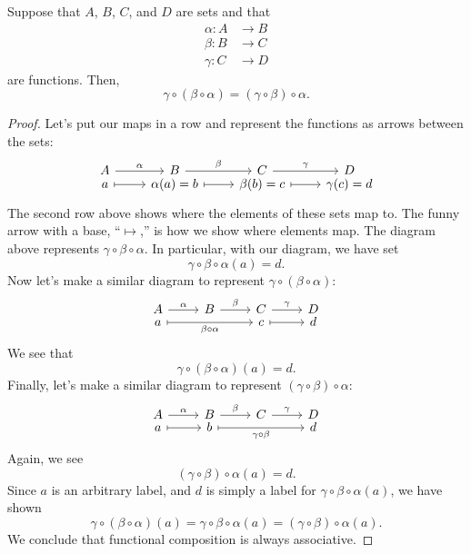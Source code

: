 \documentclass{ximera}
\begin{document}
\begin{lemma}\label{L:funCompAss}
  Suppose that $A$, $B$, $C$, and $D$ are sets and that
  \begin{align*}
    \alpha:A &\to B\\
    \beta:B &\to C\\
    \gamma:C &\to D
  \end{align*}
  are functions. Then,
  \[
  \gamma\circ(\beta\circ\alpha) = (\gamma\circ\beta)\circ\alpha.
  \]
  \begin{proof}
    Let's put our maps in a row and represent the functions as arrows
    between the sets:
    \[
    \begin{tikzcd}[row sep=-1ex]%
      A \ar[r,"\alpha"] & B \ar[r,"\beta"] & C \ar[r,"\gamma"] & D\\
      a \ar[mapsto,r] & \alpha(a) = b  \ar[mapsto,r] & \beta(b) = c  \ar[mapsto,r] & \gamma(c)=d 
    \end{tikzcd}
    \]
    The second row above shows where the elements of these sets map
    to. The funny arrow with a base, ``$\mapsto$,'' is how we show
    where elements map. The diagram above represents
    $\gamma\circ\beta\circ\alpha$. In particular, with our diagram, we have set
    \[
    \gamma\circ\beta\circ\alpha(a) = d.
    \]
    Now let's make a similar diagram to
    represent $\gamma\circ(\beta\circ\alpha)$:
    \[
    \begin{tikzcd}[row sep=-1ex]%
      A \ar[r,"\alpha"] & B \ar[r,"\beta"] & C \ar[r,"\gamma"] & D\\
      a \ar[mapsto,rr,"\beta\circ\alpha",swap] &  & c  \ar[mapsto,r] & d 
    \end{tikzcd}
    \]
    We see that
    \[
    \gamma\circ(\beta\circ\alpha)(a) = d.
    \]
    Finally, let's make a similar diagram to
    represent $(\gamma\circ\beta)\circ\alpha$:
    \[
    \begin{tikzcd}[row sep=-1ex]%
      A \ar[r,"\alpha"] & B \ar[r,"\beta"] & C \ar[r,"\gamma"] & D\\
      a \ar[mapsto,r] & b \ar[rr,mapsto,"\gamma\circ\beta",swap] &   & d 
    \end{tikzcd}
    \]
    Again, we see
    \[
    (\gamma\circ\beta)\circ\alpha(a) = d.
    \]
    Since $a$ is an arbitrary label, and $d$ is simply a label for
    $\gamma\circ\beta\circ\alpha(a)$, we have shown
    \[
    \gamma\circ(\beta\circ\alpha)(a) = \gamma\circ\beta\circ\alpha(a) = (\gamma\circ\beta)\circ\alpha(a).
    \]
    We conclude that functional composition is always associative.
  \end{proof}
\end{lemma}
\end{document}
